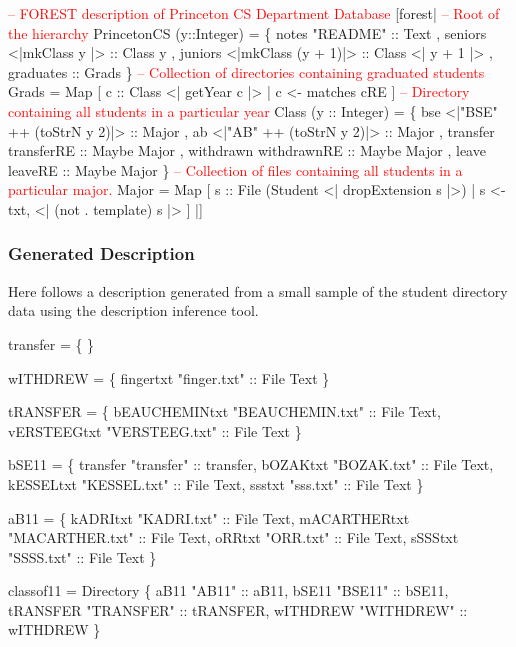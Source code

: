 \begin{code}
\textcolor{red}{-- FOREST description of Princeton CS Department Database}
[forest|
  \textcolor{red}{-- Root of the hierarchy}
   PrincetonCS (y::Integer) = 
    \{ notes      "README" :: Text
    , seniors    <|mkClass y      |> :: Class y
    , juniors    <|mkClass (y + 1)|> :: Class <| y + 1 |>
    , graduates :: Grads
    \}
\mbox{}
  \textcolor{red}{-- Collection of directories containing graduated students}
   Grads = 
     Map [ c :: Class <| getYear c |> | c <- matches cRE ] 
\mbox{}
  \textcolor{red}{-- Directory containing all students in a particular year}
   Class (y :: Integer) = 
    \{ bse  <|"BSE" ++ (toStrN y 2)|> :: Major
    , ab   <|"AB"  ++ (toStrN y 2)|> :: Major   
    , transfer   transferRE  :: Maybe Major 
    , withdrawn  withdrawnRE :: Maybe Major 
    , leave      leaveRE     :: Maybe Major 
    \}
\mbox{}
  \textcolor{red}{-- Collection of files containing all students in a particular major.}
   Major = Map 
    [ s :: File (Student <| dropExtension s |>) 
    | s <-  txt,  <| (not . template) s |>  ]  
|]
\end{code}
\vfill{}

\subsubsection{Generated Description}

Here follows a description generated from a small sample of the
student directory data using the description inference tool.

\begin{code}
 transfer =  \{
\}

 wITHDREW =  \{
    fingertxt  "finger.txt" :: File Text
\}

 tRANSFER =  \{
    bEAUCHEMINtxt  "BEAUCHEMIN.txt" :: File Text,
    vERSTEEGtxt  "VERSTEEG.txt" :: File Text
\}

 bSE11 =  \{
    transfer  "transfer" :: transfer,
    bOZAKtxt  "BOZAK.txt" :: File Text,
    kESSELtxt  "KESSEL.txt" :: File Text,
    ssstxt  "sss.txt" :: File Text
\}

 aB11 =  \{
    kADRItxt  "KADRI.txt" :: File Text,
    mACARTHERtxt  "MACARTHER.txt" :: File Text,
    oRRtxt  "ORR.txt" :: File Text,
    sSSStxt  "SSSS.txt" :: File Text
\}

 classof11 = Directory \{
    aB11  "AB11" :: aB11,
    bSE11  "BSE11" :: bSE11,
    tRANSFER  "TRANSFER" :: tRANSFER,
    wITHDREW  "WITHDREW" :: wITHDREW
\}
\end{code}
